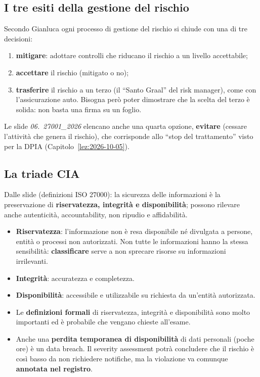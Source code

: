\subsection{I tre esiti della gestione del rischio}
Secondo Gianluca ogni processo di gestione del rischio si chiude con una di tre decisioni:
\begin{enumerate}
  \item \textbf{mitigare}: adottare controlli che riducano il rischio a un livello accettabile;
  \item \textbf{accettare} il rischio (mitigato o no);
  \item \textbf{trasferire} il rischio a un terzo (il ``Santo Graal'' del risk manager), come con
    l'assicurazione auto. Bisogna però poter dimostrare che la scelta del terzo è solida: non basta
    una firma su un foglio.
\end{enumerate}

\begin{nota}
Le slide \emph{06.~27001\_2026} elencano anche una quarta opzione, \textbf{evitare} (cessare
l'attività che genera il rischio), che corrisponde allo ``stop del trattamento'' visto per la DPIA
(Capitolo~\ref{lez:2026-10-05}).
\end{nota}

\subsection{La triade CIA}
Dalle slide (definizioni ISO 27000): la sicurezza delle informazioni è la preservazione di
\textbf{riservatezza, integrità e disponibilità}; possono rilevare anche autenticità,
accountability, non ripudio e affidabilità.
\begin{itemize}
  \item \textbf{Riservatezza}: l'informazione non è resa disponibile né divulgata a persone, entità o
    processi non autorizzati. Non tutte le informazioni hanno la stessa sensibilità:
    \textbf{classificare} serve a non sprecare risorse su informazioni irrilevanti.
  \item \textbf{Integrità}: accuratezza e completezza.
  \item \textbf{Disponibilità}: accessibile e utilizzabile su richiesta da un'entità autorizzata.
\end{itemize}

\begin{esame}
\begin{itemize}
  \item Le \textbf{definizioni formali} di riservatezza, integrità e disponibilità sono molto
    importanti ed è probabile che vengano chieste all'esame.
  \item Anche una \textbf{perdita temporanea di disponibilità} di dati personali (poche ore) è un
    data breach. Il severity assessment potrà concludere che il rischio è così basso da non
    richiedere notifiche, ma la violazione va comunque \textbf{annotata nel registro}.
\end{itemize}
\end{esame}


